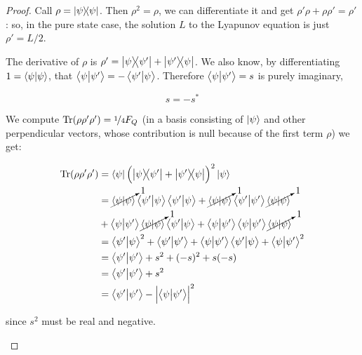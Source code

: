 \documentclass[main.tex]{subfiles}
\begin{document}
\begin{proof}

Call \( \rho = \ketbra{\psi} \). Then \(\rho ^2 = \rho\), we can differentiate it and get
\( \rho' \rho + \rho \rho' = \rho' \): so, in the pure state case, the solution \(L\) to the Lyapunov equation is just \( \rho ' = L/2 \).

\begin{bluebox}

  The derivative of \( \rho \) is \( \rho' = \ketbra{\psi}{\psi'} + \ketbra{\psi'}{\psi} \).
  We also know, by differentiating \(1 = \braket{\psi}{\psi} \), that \(\braket{\psi}{\psi'} = - \braket{\psi'}{\psi} \). Therefore \(\braket{\psi}{\psi'} = s\) is purely imaginary,

    \begin{equation} \label{eq:product-evolved-state-imaginary}
    s = -s^*
    \end{equation}

  We compute \( \Tr(\rho \rho' \rho') = \frac[i]{1}{4} F_Q\) (in a basis consisting of \(\ket{\psi } \) and other perpendicular vectors, whose contribution is null because of the first term \(\rho\)) we get:

\begin{subequations}
\begin{align}
   \operatorname*{Tr}(\rho \rho' \rho')
   &= \bra{\psi} \qty(\ketbra{\psi}{\psi'} + \ketbra{\psi'}{\psi})^2 \ket{\psi}   \\
   &= \cancelto{1}{\braket{\psi}{\psi}}\braket{\psi'}{\psi}\braket{\psi'}{\psi}
   + \cancelto{1}{\braket{\psi}{\psi}}\braket{\psi'}{\psi'}\cancelto{1}{\braket{\psi}{\psi}} \nonumber \\
   &+ \braket{\psi}{\psi'}\cancelto{1}{\braket{\psi}{\psi}}\braket{\psi'}{\psi}
   + \braket{\psi}{\psi'}\braket{\psi}{\psi'}\cancelto{1}{\braket{\psi}{\psi}} \\
   &= \braket{\psi'}{\psi}^2
   + \braket{\psi'}{\psi'} + \braket{\psi}{\psi'}\braket{\psi'}{\psi}
   + \braket{\psi}{\psi'}^2  \\
   &= \braket{\psi'}{\psi'} + s^2 + (-s)^2 + s(-s)  \\
   &= \braket{\psi'}{\psi'} + s^2  \\
   &= \braket{\psi'}{\psi'} - \abs{\braket{\psi}{\psi'}}^2
\end{align}
\end{subequations}

since \(s^2 \) must be real and negative.

\end{bluebox}
\end{proof}
\end{document}
